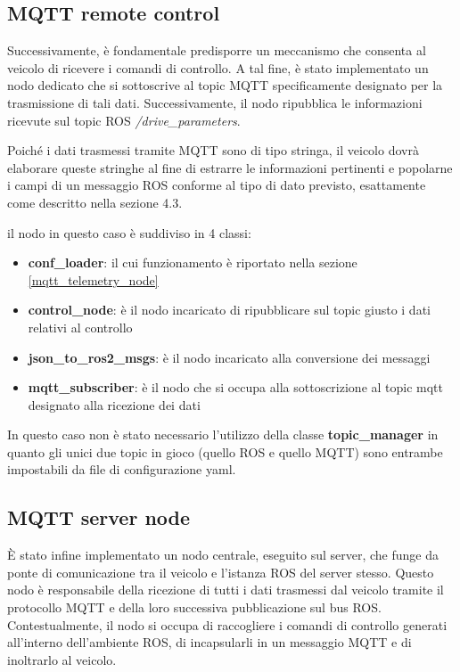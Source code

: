 \subsection{MQTT remote control} \label{mqtt_remote_control}
Successivamente, è fondamentale predisporre un meccanismo che consenta al veicolo di ricevere i comandi di controllo. A tal fine, è stato implementato un nodo dedicato che si sottoscrive al topic MQTT specificamente designato per la trasmissione di tali dati. Successivamente, il nodo ripubblica le informazioni ricevute sul topic ROS \textit{/drive\_parameters}.

\noindent Poiché i dati trasmessi tramite MQTT sono di tipo stringa, il veicolo dovrà elaborare queste stringhe al fine di estrarre le informazioni pertinenti e popolarne i campi di un messaggio ROS conforme al tipo di dato previsto, esattamente come descritto nella sezione 4.3.

\noindent il nodo in questo caso è suddiviso in 4 classi: 

\begin{itemize}
  \item \textbf{conf\_loader}: il cui funzionamento è riportato nella sezione \ref{mqtt_telemetry_node}
  \item \textbf{control\_node}: è il nodo incaricato di ripubblicare sul topic giusto i dati relativi al controllo
  \item \textbf{json\_to\_ros2\_msgs}: è il nodo incaricato alla conversione dei messaggi
  \item \textbf{mqtt\_subscriber}: è il nodo che si occupa alla sottoscrizione al topic mqtt designato alla ricezione dei dati
\end{itemize}

\noindent In questo caso non è stato necessario l'utilizzo della classe \textbf{topic\_manager} in quanto gli unici due topic in gioco (quello ROS e quello MQTT) sono entrambe impostabili da file di configurazione yaml.

\subsection{MQTT server node}
È stato infine implementato un nodo centrale, eseguito sul server, che funge da ponte di comunicazione tra il veicolo e l'istanza ROS del server stesso. Questo nodo è responsabile della ricezione di tutti i dati trasmessi dal veicolo tramite il protocollo MQTT e della loro successiva pubblicazione sul bus ROS. Contestualmente, il nodo si occupa di raccogliere i comandi di controllo generati all'interno dell'ambiente ROS, di incapsularli in un messaggio MQTT e di inoltrarlo al veicolo.

